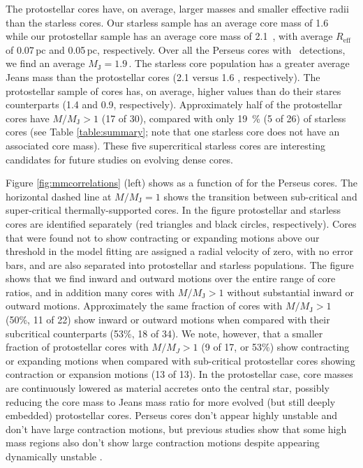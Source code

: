 \documentclass[iop,twocolappendix]{emulateapj}
\begin{document}
The protostellar cores have, on average, larger masses and smaller effective radii than the starless cores. Our starless sample has an average core mass of 1.6~{\Msun} while our protostellar sample has an average core mass of 2.1~{\Msun}, with average $R_\mathrm{eff}$ of 0.07\,pc and 0.05\,pc, respectively. Over all the Perseus cores with \HCO\ detections, we find an average $M_\mathrm{J} = 1.9$\,\Msun. The starless core population has a greater average Jeans mass than the protostellar cores (2.1 {\Msun} versus 1.6 {\Msun}, respectively). The protostellar sample of cores has, on average, higher {\MMJ} values than do their stares counterparts (1.4 and 0.9, respectively). Approximately half of the protostellar cores have $M/M_\mathrm{J} > 1$ (17 of 30), compared with only 19\ \% (5 of 26) of starless cores (see Table \ref{table:summary}; note that one starless core does not have an associated core mass). These five supercritical starless cores are interesting candidates for future studies on evolving dense cores. 

Figure \ref{fig:mmcorrelations} (left) shows {\MMJ} as a function of {\Vin} for the Perseus cores. The horizontal dashed line at $M/M_\mathrm{J} = 1$ shows the transition between sub-critical and super-critical thermally-supported cores. In the figure protostellar and starless cores are identified separately (red triangles and black circles, respectively). Cores that were found not to show contracting or expanding motions above our threshold in the {\Hill} model fitting are assigned a radial velocity of zero, with no error bars, and are also separated into protostellar and starless populations. The figure shows that we find inward and outward motions over the entire range of core {\MMJ} ratios, and in addition many cores with $M/M_\mathrm{J} > 1$ without substantial inward or outward motions. Approximately the same fraction of cores with $M/M_\mathrm{J} > 1$ (50\%, 11 of 22) show inward or outward motions when compared with their subcritical counterparts (53\%, 18 of 34). We note, however, that a smaller fraction of protostellar cores with $M/M_J > 1$ (9 of 17, or 53\%) show contracting or expanding motions when compared with sub-critical protostellar cores showing contraction or expansion motions (13 of 13). In the protostellar case, core masses are continuously lowered as material accretes onto the central star, possibly reducing the core mass to Jeans mass ratio for more evolved (but still deeply embedded) protostellar cores. Perseus cores don't appear highly unstable and don't have large contraction motions, but previous studies show that some high mass regions also don't show large contraction motions despite appearing dynamically unstable \citep{Kauffmann2013}.
\end{document}
